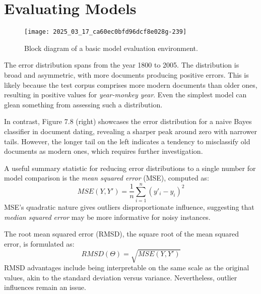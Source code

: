 \documentclass[10pt]{article}
\begin{document}
\section{Evaluating Models}

\begin{figure}[H]
\centering
\texttt{[image: 2025\_03\_17\_ca60ec0bfd96dcf8e028g-239]}
\caption{Block diagram of a basic model evaluation environment.}
\end{figure}

The error distribution spans from the year 1800 to 2005. The distribution is broad and asymmetric, with more documents producing positive errors. This is likely because the test corpus comprises more modern documents than older ones, resulting in positive values for \textit{year-monkey year}. Even the simplest model can glean something from assessing such a distribution.

In contrast, Figure 7.8 (right) showcases the error distribution for a naive Bayes classifier in document dating, revealing a sharper peak around zero with narrower tails. However, the longer tail on the left indicates a tendency to misclassify old documents as modern ones, which requires further investigation.

A useful summary statistic for reducing error distributions to a single number for model comparison is the \textit{mean squared error} (MSE), computed as:
\[ 
MSE(Y, Y') = \frac{1}{n} \sum_{i=1}^{n}(y'_i-y_i)^2 
\]
MSE's quadratic nature gives outliers disproportionate influence, suggesting that \textit{median squared error} may be more informative for noisy instances.

The root mean squared error (RMSD), the square root of the mean squared error, is formulated as:
\[ 
RMSD(\Theta) = \sqrt{MSE(Y, Y')} 
\]
RMSD advantages include being interpretable on the same scale as the original values, akin to the standard deviation versus variance. Nevertheless, outlier influences remain an issue.
\end{document}
